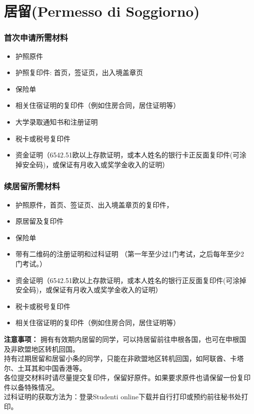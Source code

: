\section{居留(Permesso di Soggiorno)}
\subsubsection{首次申请所需材料}
\begin{itemize} 
\item 护照原件
\item 护照复印件: 首页，签证页，出入境盖章页
\item 保险单 
\item 相关住宿证明的复印件（例如住房合同，居住证明等）
\item 大学录取通知书和注册证明
\item 税卡或税号复印件
\item 资金证明（6542.51欧以上存款证明，或本人姓名的银行卡正反面复印件(可涂掉安全码)，或保证有月收入或奖学金收入的证明）
\end{itemize}

\subsubsection{续居留所需材料}
\begin{itemize} 
\item 护照原件，首页、签证页、出入境盖章页的复印件，
\item 原居留及复印件
\item 保险单
\item 带有二维码的注册证明和过科证明  （第一年至少过1门考试，之后每年至少2门考试。）
\item 资金证明（6542.51欧以上存款证明，或本人姓名的银行正反面复印件(可涂掉安全码)，或保证有月收入或奖学金收入的证明）
\item 税卡或税号复印件
\item 相关住宿证明的复印件（例如住房合同，居住证明等）
\end{itemize}
\textbf{注意事项：}
拥有有效期内居留的同学，可以持居留前往申根各国，也可在申根国及非欧盟地区转机回国。\\
持有过期居留和居留小条的同学，只能在非欧盟地区转机回国，如阿联酋、卡塔尔、土耳其和中国香港等。\\
各位提交材料时请尽量提交复印件，保留好原件。如果要求原件也请保留一份复印件以备特殊情况。\\
过科证明的获取方法为：登录Studenti online下载并自行打印或预约前往秘书处打印。\\

